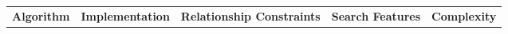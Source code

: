 \setlength\tabcolsep{0pt}
\small{
\begin{table*}[h!]
    \begin{center}
        \begin{tabular}{|c|ccc|cccc|ccc|c|} 

        

            \hline
            \multicolumn{1}{|c|}{\multirow{2}{*}{\textbf{Algorithm}}}& 
            \multicolumn{3}{|c|}{\multirow{2}{*}{\textbf{Implementation}}} &
            \multicolumn{4}{|c|}{\multirow{2}{*}{\textbf{Relationship Constraints}}} &
            \multicolumn{3}{|c|}{\multirow{2}{*}{\textbf{Search Features}}} &
            \multicolumn{1}{|c|}{\multirow{2}{*}{\textbf{Complexity}}} \\
            &&&&&&&&&&& \\
        

\end{tabular}
\end{center}
\end{table*}}
